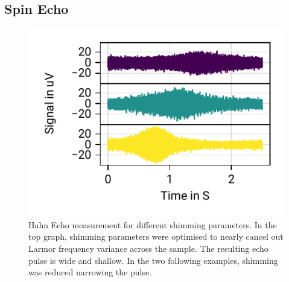 \documentclass[
    parskip=half, 
    twoside=false,
    twocolumn=true,
    fontsize=11pt,
]{scrarticle}
\begin{document}
\subsection{Spin Echo}
\begin{figure}
        \centering
        \includegraphics{figures/04 spin echo shims.pdf}
        \caption{Hahn Echo measurement for different shimming parameters. In the top graph, shimming parameters were optimised to nearly cancel out Larmor frequency variance across the sample. The resulting echo pulse is wide and shallow. In the two following examples, shimming was reduced narrowing the pulse.}
        \label{fig:hahn}        
 \end{figure}
\end{document}
